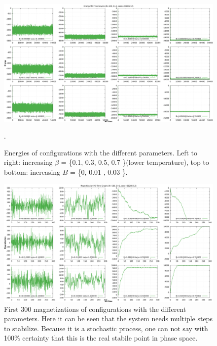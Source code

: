 \documentclass[11pt,a4paper]{article}
\begin{document}
\begin{figure}
\centering
\includegraphics[scale=0.35]{all_energy.png}
\caption{Energies of configurations with the different parameters. Left to right: increasing $\beta$ = \{0.1, 0.3, 0.5, 0.7 \}(lower temperature), top to bottom: increasing $B$ = \{0, 0.01 , 0.03 \}.}.
\label{fig:foo2}
\end{figure}
\begin{figure}
\centering
\includegraphics[scale=0.35]{all_magnet_f300.png}
\caption{First 300 magnetizations of configurations with the different parameters. Here it can be seen that the system needs multiple steps to stabilize. Because it is a stochastic process, one can not say with 100\% certainty that this is the real stabile point in phase space.}
\label{fig:foo}
\end{figure}
\end{document}
